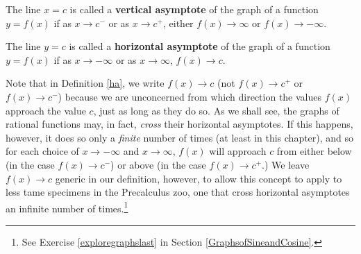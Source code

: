 \begin{tcolorbox}

\begin{defn} \label{va} The line $x=c$ is called a \textbf{vertical asymptote} of the graph of a function $y=f(x)$ if as $x \rightarrow c^{-}$ or as $x \rightarrow c^{+}$, either $f(x) \rightarrow \infty$ or $f(x) \rightarrow -\infty$.

\end{defn}
\end{tcolorbox}

\begin{tcolorbox}

\begin{defn} \label{ha} The line $y=c$ is called a \textbf{horizontal asymptote} of the graph of a function $y=f(x)$ if as $x \rightarrow -\infty$ or as $x \rightarrow \infty$, $f(x) \rightarrow c$.

\end{defn}
\end{tcolorbox}

Note that in Definition \ref{ha}, we write $f(x) \rightarrow c$ (not $f(x) \rightarrow c^{+}$ or $f(x) \rightarrow c^{-}$) because we are unconcerned from which direction the values $f(x)$ approach the value $c$, just as long as they do so.  As we shall see, the graphs of rational functions may, in fact, \textit{cross} their horizontal asymptotes.  If this happens, however,  it does so only a \textit{finite} number of times (at least in this chapter), and so for each choice of $x \rightarrow -\infty$ and $x \rightarrow \infty$, $f(x)$ will approach $c$ from either below (in the case $f(x) \rightarrow c^{-}$) or above (in the case $f(x) \rightarrow c^{+}$.)  We leave $f(x) \rightarrow c$ generic in our definition, however, to allow this concept to apply to less tame specimens in the Precalculus zoo, one that cross horizontal asymptotes an infinite number of times.\footnote{See Exercise \ref{exploregraphslast} in Section \ref{GraphsofSineandCosine}.}

